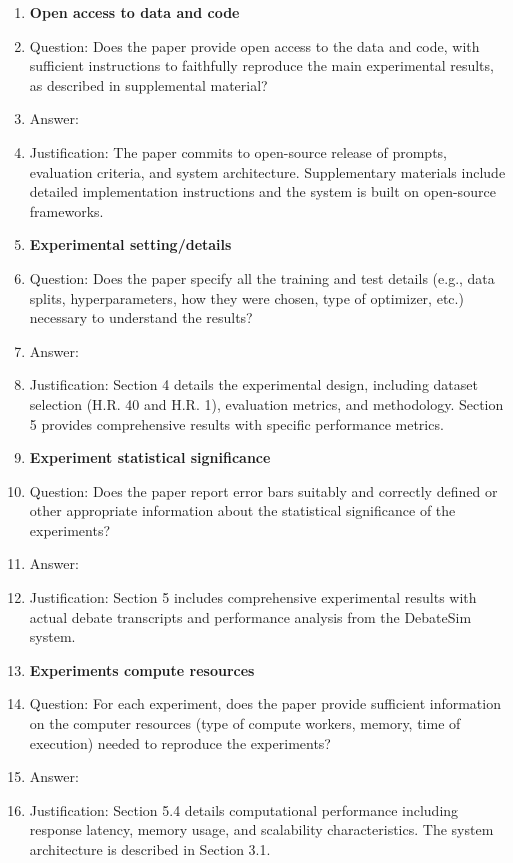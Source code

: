 \documentclass[11pt]{article}
\begin{document}
\begin{enumerate}
\item {\bf Open access to data and code}
    \item[] Question: Does the paper provide open access to the data and code, with sufficient instructions to faithfully reproduce the main experimental results, as described in supplemental material?
    \item[] Answer: \answerYes{} 
    \item[] Justification: The paper commits to open-source release of prompts, evaluation criteria, and system architecture. Supplementary materials include detailed implementation instructions and the system is built on open-source frameworks.
    
\item {\bf Experimental setting/details}
    \item[] Question: Does the paper specify all the training and test details (e.g., data splits, hyperparameters, how they were chosen, type of optimizer, etc.) necessary to understand the results?
    \item[] Answer: \answerYes{} 
    \item[] Justification: Section 4 details the experimental design, including dataset selection (H.R. 40 and H.R. 1), evaluation metrics, and methodology. Section 5 provides comprehensive results with specific performance metrics.
    
\item {\bf Experiment statistical significance}
    \item[] Question: Does the paper report error bars suitably and correctly defined or other appropriate information about the statistical significance of the experiments?
    \item[] Answer: \answerYes{} 
    \item[] Justification: Section 5 includes comprehensive experimental results with actual debate transcripts and performance analysis from the DebateSim system.
    
\item {\bf Experiments compute resources}
    \item[] Question: For each experiment, does the paper provide sufficient information on the computer resources (type of compute workers, memory, time of execution) needed to reproduce the experiments?
    \item[] Answer: \answerYes{} 
    \item[] Justification: Section 5.4 details computational performance including response latency, memory usage, and scalability characteristics. The system architecture is described in Section 3.1.
    

\end{enumerate}
\end{document}
